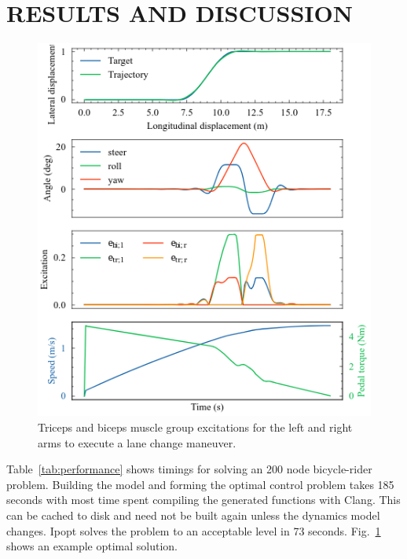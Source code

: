 \documentclass[11pt,twocolumn]{article}
\begin{document}

\vspace{-1em}
\section*{RESULTS AND DISCUSSION}
\vspace{-1em}
%
\begin{figure}
    \centering
    \includegraphics[width=0.7\linewidth]{figures/arm-muscle-bicycle-excitation.png}
    \caption{Triceps and biceps muscle group excitations for the left and right
      arms to execute a lane change maneuver.}
    \label{fig:trajectories}
\end{figure}

Table~\ref{tab:performance} shows timings for solving an 200 node bicycle-rider
problem. Building the model and forming the optimal control problem takes 185
seconds with most time spent compiling the generated functions with Clang. This
can be cached to disk and need not be built again unless the dynamics model
changes. Ipopt solves the problem to an acceptable level in 73 seconds.
Fig.~\ref{fig:trajectories} shows an example optimal solution.
\end{document}
